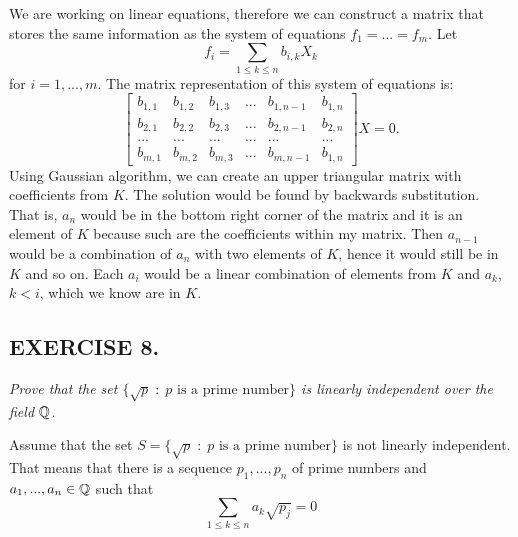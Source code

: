 \documentclass{article}
\begin{document}
We are working on linear equations, therefore we can construct a matrix that stores the same information as the system of equations $f_1=...=f_m$. Let
$$f_i=\sum\limits_{1\leq k\leq n}b_{i, k}X_k$$
for $i=1,...,m$. The matrix representation of this system of equations is:
$$\begin{bmatrix}
    b_{1,1} & b_{1, 2} & b_{1, 3} &... &b_{1, n-1} & b_{1, n}\\
    b_{2,1} & b_{2, 2} & b_{2, 3} &... &b_{2, n-1} & b_{2, n}\\
    ...     &   ...    & ...      &... & ...       & ...\\
    b_{m,1} & b_{m, 2} & b_{m, 3} &... &b_{m, n-1} & b_{1, n}
\end{bmatrix}X=0.$$
Using Gaussian algorithm, we can create an upper triangular matrix with coefficients from $K$. The solution would be found by backwards substitution. That is, $a_n$ would be in the bottom right corner of the matrix and it is an element of $K$ because such are the coefficients within my matrix. Then $a_{n-1}$ would be a combination of $a_n$ with two elements of $K$, hence it would still be in $K$ and so on. Each $a_i$ would be a linear combination of elements from $K$ and $a_k$, $k<i$, which we know are in $K$.

\proofend

\subsection*{EXERCISE 8.}
\emph{Prove that the set $\{\sqrt{p}\;:\;p\text{ is a prime number}\}$ is linearly independent over the field $\mathbb{Q}$.}
\smallskip


Assume that the set $S=\{\sqrt{p}\;:\;p\text{ is a prime number}\}$ is not linearly independent. That means that there is a sequence $p_1,...,p_n$ of prime numbers and $a_1,...,a_n\in\mathbb{Q}$ such that
$$\sum\limits_{1\leq k\leq n}a_k\sqrt{p_j}=0$$
\end{document}
